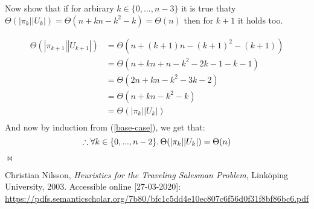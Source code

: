 \documentclass{article}
\newcommand{\qed}{\begin{flushright}$\bowtie$\end{flushright}}
\begin{document}
Now show that if for arbirary $k\in\{0,...,n-3\}$ it is true thaty
$\Theta(|\pi_k||U_k|) = \Theta(n + kn - k^2 - k) = \Theta(n)$ then for
$k+1$ it holds too.

\begin{align*}
  \Theta(|\pi_{k+1}||U_{k+1}|) & = \Theta(n + (k+1)n - (k+1)^2 - (k+1)) \\
                               & = \Theta(n + kn + n - k^2 - 2k - 1 -k -1) \\
                               & = \Theta(2n + kn - k^2 - 3k - 2) \\
                               & = \Theta(n + kn - k^2 - k) \\
                               & = \Theta(|\pi_k||U_k|) \\
\end{align*}
And now by induction from (\ref*{base-case}), we get that:
\[ \therefore \forall k\in\{0,...,n-2\}\ldotp
  \Theta(|\pi_k||U_k|) = \Theta(n)\]
\qed



\begin{thebibliography}{9}
  Christian Nilsson,
  \textit{Heuristics for the Traveling Salesman Problem},
  Link\"oping University,
  2003.
  Accessible online [27-03-2020]: \url{https://pdfs.semanticscholar.org/7b80/bfc1c5dd4e10ec807c6f56d0f31f8bf86bc6.pdf}
\end{thebibliography}
\end{document}
